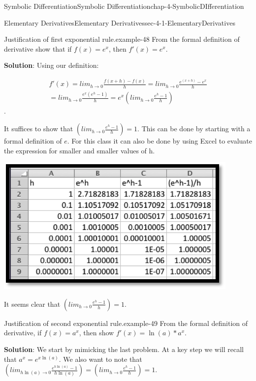 \documentclass[oneside,10pt,]{book}
\newcommand{\terminology}[1]{\textbf{#1}}
\numberwithin{equation}{section}
\begin{document}
\begin{chapterptx}{Symbolic Differentiation}{}{Symbolic Differentiation}{}{}{chap-4-SymbolicDIfferentiation}
\begin{sectionptx}{Elementary Derivatives}{}{Elementary Derivatives}{}{}{sec-4-1-ElementaryDerivatives}
\begin{example}{Justification of first exponential rule.}{example-48}%
\hypertarget{p-1456}{}%
From the formal definition of derivative show that if \(f(x)=e^x\), then \(f'(x)=e^x\).%
\par
\hypertarget{p-1457}{}%
\terminology{Solution}: Using our definition:%
\par
\hypertarget{p-1458}{}%
%
\begin{gather*}
f'(x)=lim_{h\to0}\frac{f(x+h)-f(x)}{h}
=lim_{h\to0}\frac{e^{(x+h)}-e^x}{h}\\
=lim_{h\to0}\frac{e^x(e^h-1)}{h}
=e^x\left(lim_{h\to0}\frac{e^h-1}{h}\right)
\end{gather*}
%
. \par
\hypertarget{p-1459}{}%
It suffices to show that \(\left(lim_{h\to0}\frac{e^h-1}{h}\right) =1\).  This can be done by starting with a formal definition of \(e\).  For this class it can also be done by using Excel to evaluate the expression for smaller and smaller values of h.%
\begin{sidebyside}{1}{0.2}{0.2}{0}%
\begin{sbspanel}{0.6}%
\includegraphics[width=1\linewidth]{images/sec4-1-1.png}
\end{sbspanel}%
\end{sidebyside}%
\par
\hypertarget{p-1460}{}%
It seems clear that \(\left(lim_{h\to0}\frac{e^h-1}{h}\right) =1\).%
\end{example}
\begin{example}{Justification of second exponential rule.}{example-49}%
\hypertarget{p-1461}{}%
From the formal definition of derivative, if \(f(x)=a^x\), then show \(f'(x)=\ln(a)*a^x\).%
\par
\hypertarget{p-1462}{}%
\terminology{Solution}: We start by mimicking the last problem.  At a key step we will recall that \(a^x=e^{x \ln(a)}\).  We also want to note that \(\left(lim_{h\ln(a) \to0}\frac{e^{h\ln(a)}-1}{h\ln(a)}\right) = \left(lim_{h\to0}\frac{e^h-1}{h}\right) =1\).%

\end{example}
\end{sectionptx}
\end{chapterptx}
\end{document}
